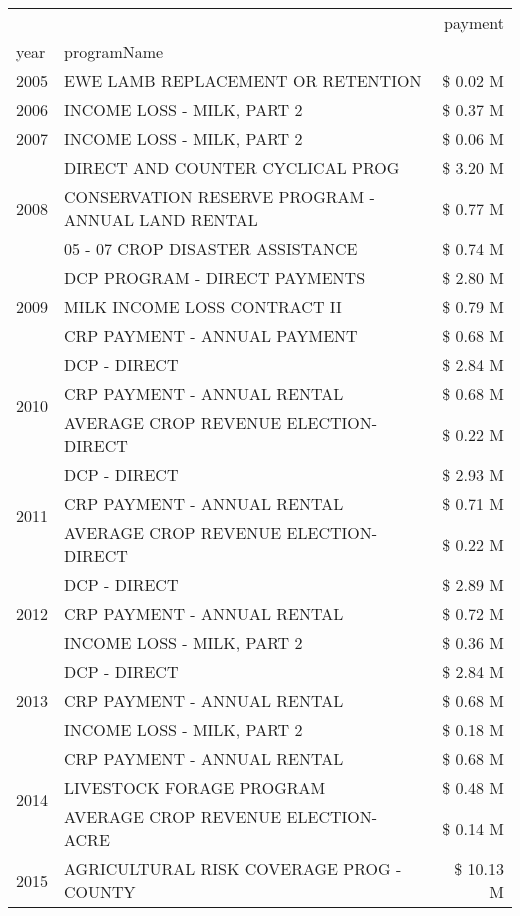 \begin{tabular}{llr}
\toprule
 &  & payment \\
year & programName &  \\
\midrule
2005 & EWE LAMB REPLACEMENT OR RETENTION & \$ 0.02 M \\
\cline{1-3}
2006 & INCOME LOSS - MILK, PART 2 & \$ 0.37 M \\
\cline{1-3}
2007 & INCOME LOSS - MILK, PART 2 & \$ 0.06 M \\
\cline{1-3}
\multirow[t]{3}{*}{2008} & DIRECT AND COUNTER CYCLICAL PROG & \$ 3.20 M \\
 & CONSERVATION RESERVE PROGRAM - ANNUAL LAND RENTAL & \$ 0.77 M \\
 & 05 - 07 CROP DISASTER ASSISTANCE & \$ 0.74 M \\
\cline{1-3}
\multirow[t]{3}{*}{2009} & DCP PROGRAM - DIRECT PAYMENTS & \$ 2.80 M \\
 & MILK INCOME LOSS CONTRACT II & \$ 0.79 M \\
 & CRP PAYMENT - ANNUAL PAYMENT & \$ 0.68 M \\
\cline{1-3}
\multirow[t]{3}{*}{2010} & DCP - DIRECT & \$ 2.84 M \\
 & CRP PAYMENT - ANNUAL RENTAL & \$ 0.68 M \\
 & AVERAGE CROP REVENUE ELECTION-DIRECT & \$ 0.22 M \\
\cline{1-3}
\multirow[t]{3}{*}{2011} & DCP - DIRECT & \$ 2.93 M \\
 & CRP PAYMENT - ANNUAL RENTAL & \$ 0.71 M \\
 & AVERAGE CROP REVENUE ELECTION-DIRECT & \$ 0.22 M \\
\cline{1-3}
\multirow[t]{3}{*}{2012} & DCP - DIRECT & \$ 2.89 M \\
 & CRP PAYMENT - ANNUAL RENTAL & \$ 0.72 M \\
 & INCOME LOSS - MILK, PART 2 & \$ 0.36 M \\
\cline{1-3}
\multirow[t]{3}{*}{2013} & DCP - DIRECT & \$ 2.84 M \\
 & CRP PAYMENT - ANNUAL RENTAL & \$ 0.68 M \\
 & INCOME LOSS - MILK, PART 2 & \$ 0.18 M \\
\cline{1-3}
\multirow[t]{3}{*}{2014} & CRP PAYMENT - ANNUAL RENTAL & \$ 0.68 M \\
 & LIVESTOCK FORAGE PROGRAM & \$ 0.48 M \\
 & AVERAGE CROP REVENUE ELECTION-ACRE & \$ 0.14 M \\
\cline{1-3}
\multirow[t]{3}{*}{2015} & AGRICULTURAL RISK COVERAGE PROG - COUNTY & \$ 10.13 M \\

\end{tabular}

